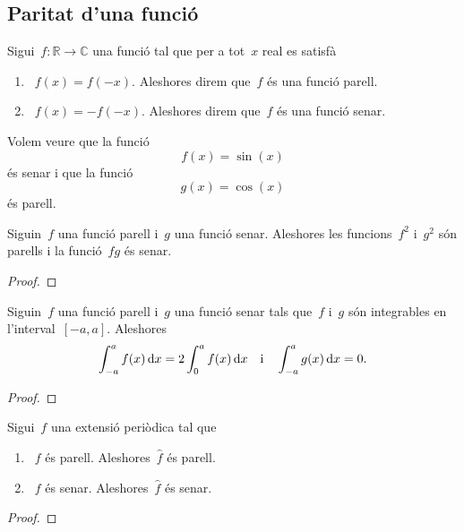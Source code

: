 \documentclass[../../main.tex]{subfiles}
\begin{document}
	\subsection{Paritat d'una funció}
	\begin{definition}
		\label{def:funció parell}
		\label{def:funció senar}
		Sigui~\(f\colon\mathbb{R}\longrightarrow\mathbb{C}\) una funció tal que per a tot~\(x\) real es satisfà
		\begin{enumerate}
			\item~\(f(x)=f(-x)\).
			Aleshores direm que~\(f\) és una funció parell.
			\item~\(f(x)=-f(-x)\).
			Aleshores direm que~\(f\) és una funció senar.
		\end{enumerate}
	\end{definition}
	\begin{example}
		\label{ex:el sinus és una funció senar}
		\label{ex:el cosinus és una funció parell}
		Volem veure que la funció
		\[
		    f(x)=\sin(x)
		\]
		és senar i que la funció
		\[
		    g(x)=\cos(x)
		\]
		és parell.
		\begin{solution}
		\end{solution}
	\end{example}
	\begin{proposition}
		\label{prop:la paritat de funcions es comporta com el producte de signes}
		Siguin~\(f\) una funció parell i~\(g\) una funció senar.
		Aleshores les funcions~\(f^{2}\) i~\(g^{2}\) són parells i la funció~\(fg\) és senar.
		\begin{proof}
		\end{proof}
	\end{proposition}
	\begin{proposition}
		\label{prop:la integral d'una funció parell en un interval simètric és el doble que en mig interval}
		\label{prop:la integral d'una funció senar en un interval simètric és 0}
		Siguin~\(f\) una funció parell i~\(g\) una funció senar tals que~\(f\) i~\(g\) són integrables en l'interval~\([-a,a]\).
		Aleshores
		\[
		    \int_{-a}^{a}f(x)\mathop{}\!\mathrm{d} x=2\int_{0}^{a}f(x)\mathop{}\!\mathrm{d} x\quad\text{i}\quad\int_{-a}^{a}g(x)\mathop{}\!\mathrm{d} x=0.
		\]
		\begin{proof}
		\end{proof}
	\end{proposition}
	\begin{lemma}
		\label{lema:la paritat d'una funció es conserva en els coeficients de fourier}
		Sigui~\(f\) una extensió periòdica tal que
		\begin{enumerate}
			\item~\(f\) és parell.
			Aleshores~\(\widehat{f}\) és parell.
			\item~\(f\) és senar.
			Aleshores~\(\widehat{f}\) és senar.
		\end{enumerate}
		\begin{proof}
		\end{proof}
	\end{lemma}
\end{document}
